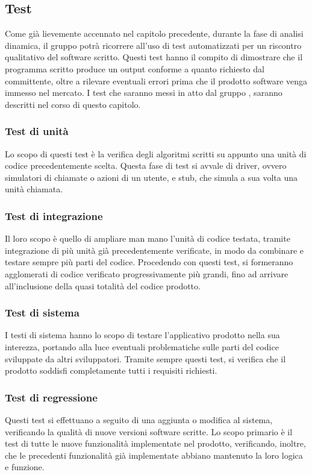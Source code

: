\subsection{Test}
Come già lievemente accennato nel capitolo precedente, durante la fase di analisi dinamica, il gruppo {\Gruppo} potrà ricorrere all’uso di test automatizzati per un riscontro qualitativo del software scritto. Questi test hanno il compito di dimostrare che il programma scritto produce un output conforme a quanto richiesto dal committente, oltre a rilevare eventuali errori prima che il prodotto software venga immesso nel mercato. I test che saranno messi in atto dal gruppo {\Gruppo}, saranno descritti nel corso di questo capitolo.

\subsubsection{Test di unità}
Lo scopo di questi test è la verifica degli algoritmi scritti su appunto una unità di codice precedentemente scelta. Questa fase di test si avvale di driver, ovvero simulatori di chiamate o azioni di un utente, e stub, che simula a sua volta una unità chiamata.

\subsubsection{Test di integrazione}
Il loro scopo è quello di ampliare man mano l’unità di codice testata, tramite integrazione di più unità già precedentemente verificate, in modo da combinare e testare sempre più parti del codice. Procedendo con questi test, si formeranno agglomerati di codice verificato progressivamente più grandi, fino ad arrivare all’inclusione della quasi totalità del codice prodotto.

\subsubsection{Test di sistema}
I testi di sistema hanno lo scopo di testare l’applicativo prodotto nella sua interezza, portando alla luce eventuali problematiche sulle parti del codice sviluppate da altri sviluppatori. Tramite sempre questi test, si verifica che il prodotto soddisfi completamente tutti i requisiti richiesti.

\subsubsection{Test di regressione}
Questi test si effettuano a seguito di una aggiunta o modifica al sistema, verificando la qualità di nuove versioni software scritte. Lo scopo primario è il test di tutte le nuove funzionalità implementate nel prodotto, verificando, inoltre, che le precedenti funzionalità già implementate abbiano mantenuto la loro logica e funzione.

